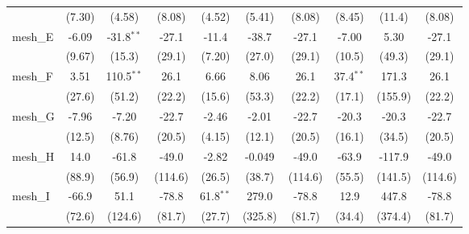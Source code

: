 \begin{tabular}{lccccccccc}
                                                               & (7.30)         & (4.58)          & (8.08)         & (4.52)        & (5.41)        & (8.08)         & (8.45)        & (11.4)          & (8.08)\\   
   mesh\_E                                                     & -6.09          & -31.8$^{**}$    & -27.1          & -11.4         & -38.7         & -27.1          & -7.00         & 5.30            & -27.1\\   
                                                               & (9.67)         & (15.3)          & (29.1)         & (7.20)        & (27.0)        & (29.1)         & (10.5)        & (49.3)          & (29.1)\\   
   mesh\_F                                                     & 3.51           & 110.5$^{**}$    & 26.1           & 6.66          & 8.06          & 26.1           & 37.4$^{**}$   & 171.3           & 26.1\\   
                                                               & (27.6)         & (51.2)          & (22.2)         & (15.6)        & (53.3)        & (22.2)         & (17.1)        & (155.9)         & (22.2)\\   
   mesh\_G                                                     & -7.96          & -7.20           & -22.7          & -2.46         & -2.01         & -22.7          & -20.3         & -20.3           & -22.7\\   
                                                               & (12.5)         & (8.76)          & (20.5)         & (4.15)        & (12.1)        & (20.5)         & (16.1)        & (34.5)          & (20.5)\\   
   mesh\_H                                                     & 14.0           & -61.8           & -49.0          & -2.82         & -0.049        & -49.0          & -63.9         & -117.9          & -49.0\\   
                                                               & (88.9)         & (56.9)          & (114.6)        & (26.5)        & (38.7)        & (114.6)        & (55.5)        & (141.5)         & (114.6)\\   
   mesh\_I                                                     & -66.9          & 51.1            & -78.8          & 61.8$^{**}$   & 279.0         & -78.8          & 12.9          & 447.8           & -78.8\\   
                                                               & (72.6)         & (124.6)         & (81.7)         & (27.7)        & (325.8)       & (81.7)         & (34.4)        & (374.4)         & (81.7)\\   

\end{tabular}
